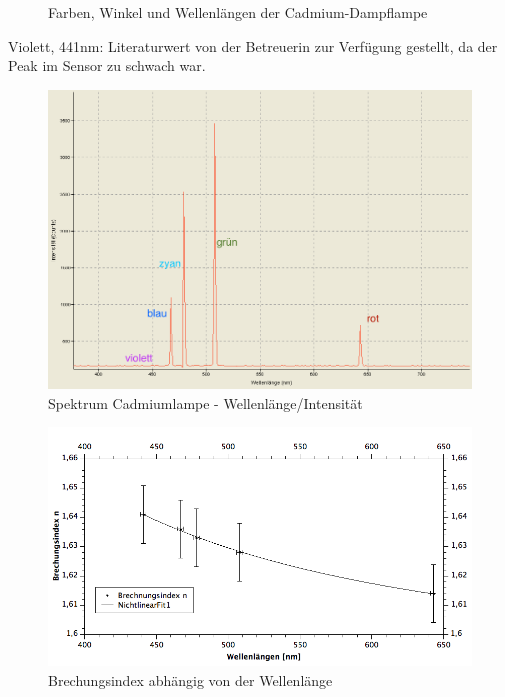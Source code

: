 \documentclass[12pt,a4paper]{article}
\begin{document}
\begin{multicols}{2}
\begin{figure}[H]
{			}
	\caption{Farben, Winkel und Wellenlängen der Cadmium-Dampflampe}
	\label{fig:werte_cadmiumdampflampe}
\end{figure}
Violett, 441nm: Literaturwert von der Betreuerin zur Verfügung gestellt, da der Peak im Sensor zu schwach war.

\end{multicols}
\begin{figure}[H]
	\centering
	\includegraphics[scale=0.40]{./figure/Spektrum_Cadmiumdampflampe_PW7_Braun_Kurz.png}
	\caption{Spektrum Cadmiumlampe - Wellenlänge/Intensität}
	\label{fig:prisma_wellenlaenge}
\end{figure}

\begin{figure}[H]
	\centering
	\includegraphics[scale=0.55]{./figure/anfpra7_spektrum_grafik.png}
	\caption{Brechungsindex abhängig von der Wellenlänge}
	\label{fig:wellenlaenge_brechungsindex}
\end{figure}
\end{document}
